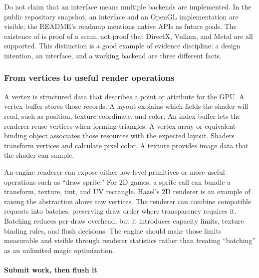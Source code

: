 Do not claim that an interface means multiple backends are implemented. In the public repository snapshot, an interface and an OpenGL implementation are visible; the README's roadmap mentions native APIs as future goals. The existence of  is proof of a seam, not proof that DirectX, Vulkan, and Metal are all supported. This distinction is a good example of evidence discipline: a design intention, an interface, and a working backend are three different facts.

\subsubsection{From vertices to useful render operations}\label{06-engine-ii-ch025-from-vertices-to-useful-render-operations}

\hypertarget{06-engine-ii-ch025-from-vertices-to-useful-render-operations}{}

A vertex is structured data that describes a point or attribute for the GPU. A vertex buffer stores those records. A layout explains which fields the shader will read, such as position, texture coordinate, and color. An index buffer lets the renderer reuse vertices when forming triangles. A vertex array or equivalent binding object associates those resources with the expected layout. Shaders transform vertices and calculate pixel color. A texture provides image data that the shader can sample.

An engine renderer can expose either low-level primitives or more useful operations such as ``draw sprite.'' For 2D games, a sprite call can bundle a transform, texture, tint, and UV rectangle. Hazel's 2D renderer is an example of raising the abstraction above raw vertices. The renderer can combine compatible requests into batches, preserving draw order where transparency requires it. Batching reduces per-draw overhead, but it introduces capacity limits, texture binding rules, and flush decisions. The engine should make those limits measurable and visible through renderer statistics rather than treating ``batching'' as an unlimited magic optimization.

\paragraph{Submit work, then flush it}\label{06-engine-ii-ch025-submit-work-then-flush-it}

\hypertarget{06-engine-ii-ch025-submit-work-then-flush-it}{}

